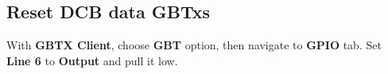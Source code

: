\subsection{Reset DCB data GBTxs}
With \textbf{GBTX Client}, choose \textbf{GBT} option, then navigate to
\textbf{GPIO} tab.
Set \textbf{Line 6} to \textbf{Output} and pull it low.
